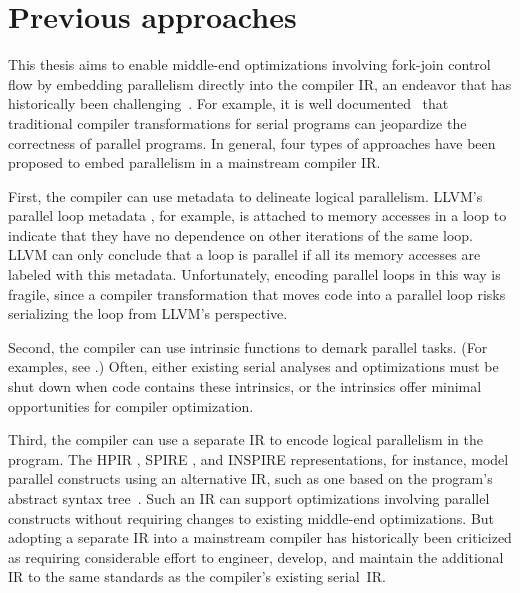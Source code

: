 
\section{Previous approaches}

This thesis aims to enable middle-end optimizations involving fork-join
control flow by embedding parallelism directly into the compiler IR,
an endeavor that has historically been challenging\
\cite{llvmdev-pir-spir, llvmdev-pir-intel}.  For example, it is well
documented\ \cite{MidkiffPa90} that traditional compiler
transformations for serial programs can jeopardize the correctness of
parallel programs.  %
In general, four types of approaches have been proposed
to embed parallelism in a mainstream compiler IR\@.

First, the compiler can use metadata to delineate logical parallelism.
LLVM's parallel loop metadata \cite{LLVMLangManual15}, for example, is
attached to memory accesses in a loop to indicate that they have no
dependence on other iterations of the same loop.
LLVM can only conclude that a loop is parallel if all its memory
accesses are labeled with this metadata.  Unfortunately, encoding
parallel loops in this way is fragile, since a compiler transformation
that moves code into a parallel loop risks serializing the loop from
LLVM's perspective.

Second, the compiler can use intrinsic functions to demark parallel
tasks.  (For examples, see \cite{ZhaoSa11, PopCo10,
  llvmdev-pir-sep12}.)  Often, either existing serial analyses and
optimizations must be shut down when code contains these intrinsics,
or the intrinsics offer minimal opportunities for compiler
optimization.

Third, the compiler can use a separate IR to encode logical
parallelism in the program.  The HPIR \cite{ZhaoSa11, BarikZhSa13},
SPIRE \cite{KhaldiJoAn12}, and INSPIRE \cite{JordanPeTh13}
representations, for instance, model parallel constructs using an
alternative IR, such as one based on the program's abstract syntax
tree~\cite[Sec.~2.5.1]{AhoLaSe06}.  Such an IR can support
optimizations involving parallel constructs without requiring changes
to existing middle-end optimizations.  But adopting a separate IR into
a mainstream compiler has historically been criticized
\cite{llvmdev-pir-mar15} as requiring considerable effort to engineer,
develop, and maintain the additional IR to the same standards as the
compiler's existing serial~IR\@.

